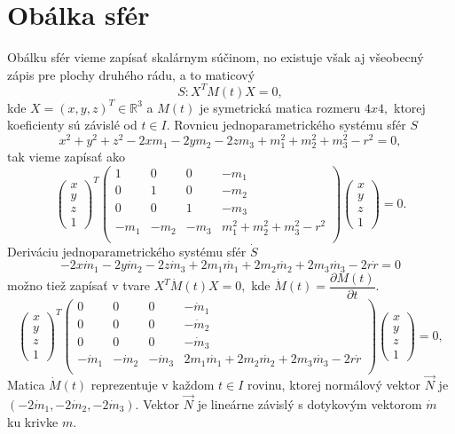 \section{Obálka sfér}
Obálku sfér vieme zapísať skalárnym súčinom, no existuje však aj všeobecný zápis pre plochy druhého rádu, a to maticový 
$$
S: X^TM(t)X = 0,
$$
kde $ X = (x, y, z)^T \in \mathbb{R}^3 $ a $M(t) $ je symetrická matica rozmeru $4x4, $ ktorej koeficienty sú závislé od $t \in I$.
Rovnicu jednoparametrického systému sfér $S$
$$ x^2 +y^2 +z^2 -2xm_1 -2ym_2 - 2zm_3 + m_1^2 + m_2^2 + m_3^2 - r^2 =0
,$$
tak vieme zapísať ako
$$
\left(\begin{matrix} x \\ y \\ z  \\ 1
\end{matrix} \right)^T \left(\begin{matrix} 
1 & 0 & 0 & - m_1 \\
0 & 1 & 0 & - m_2 \\
0 & 0 & 1 & - m_3 \\
- m_1 & - m_2 & - m_3 &  m_1^2 + m_2^2 + m_3^2 - r^2 \\
\end{matrix} \right)\left(\begin{matrix} x \\ y \\ z \\ 1
\end{matrix} \right) = 0. 
$$
Deriváciu jednoparametrického systému sfér $\dot{S}$
$$
-2x\dot{m}_1 -2y\dot{m}_2 - 2z\dot{m}_3 + 2m_1\dot{m_1} + 2m_2\dot{m_2} + 2m_3\dot{m_3} - 2r\dot{r} = 0
$$
možno tiež zapísať v tvare  $X^T\dot{M}(t)X = 0,$
kde $\dot{M}(t)= \dfrac{\partial M(t)}{\partial t}.$
$$
\left(\begin{matrix} x \\ y \\ z  \\ 1
\end{matrix} \right)^T \left(\begin{matrix} 
0 & 0 & 0 & - \dot{m}_1 \\
0 & 0 & 0 & - \dot{m}_2 \\
0 & 0 & 0 & - \dot{m}_3 \\
- \dot{m}_1 & - \dot{m}_2 & - \dot{m}_3 &  2m_1\dot{m_1} + 2m_2\dot{m_2} + 2m_3\dot{m_3} - 2r\dot{r} \\
\end{matrix} \right)\left(\begin{matrix} x \\ y \\ z \\ 1
\end{matrix} \right) = 0,
$$
Matica $\dot{M}(t)$ reprezentuje v každom $t \in I $ rovinu, ktorej normálový vektor $\vec{N} $ je $(-2\dot{m}_1, -2\dot{m}_2, -2\dot{m}_3).$ Vektor $\vec{N}$ je lineárne závislý s dotykovým vektorom $\dot{m}$ ku krivke $m.$
